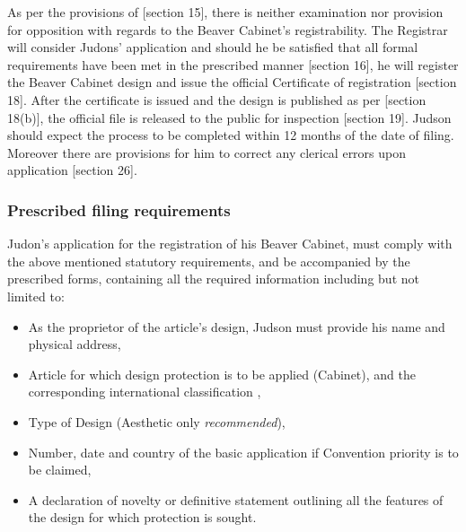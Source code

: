 \documentclass[11pt]{article}
\begin{document}
As per the provisions of [section 15]\cite{rsa93_designs_act}, there is neither
examination nor provision for opposition with regards to the Beaver Cabinet's
registrability. The Registrar will consider Judons' application and should he be
satisfied that all formal requirements have been met in the prescribed manner
[section 16]\cite{rsa93_designs_act}, he will register the Beaver Cabinet design
and issue the official Certificate of registration [section
18]\cite{rsa93_designs_act}. After the certificate is issued and the design is
published as per [section 18(b)]\cite{rsa93_designs_act}, the official file is
released to the public for inspection [section 19]\cite{rsa93_designs_act}. Judson
should expect the process to be completed within 12 months of the date of
filing. Moreover there are provisions for him to correct any clerical errors
upon application [section 26]\cite{rsa93_designs_act}.

\subsubsection{Prescribed filing requirements}
\label{sec:orgc47821a}
Judon's application for the registration of his Beaver Cabinet, must comply with
the above mentioned statutory requirements, and be accompanied by the prescribed
forms, containing all the required information including but not limited to:

\begin{itemize}
\item As the proprietor of the article's design, Judson must provide his name and
physical address,
\item Article for which design protection is to be applied (Cabinet), and the
corresponding international classification \cite{wipo79_locarno_agreement},
\item Type of Design (Aesthetic only \emph{recommended}),
\item Number, date and country of the basic application if Convention priority is to
be claimed,
\item A declaration of novelty or definitive statement outlining all the features
of the design for which protection is sought.
\end{itemize}


\printbibliography
\end{document}
